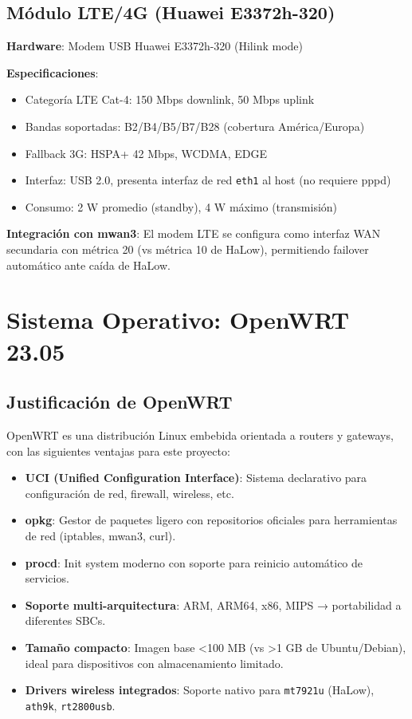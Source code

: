 \subsection{Módulo LTE/4G (Huawei E3372h-320)}

\textbf{Hardware}: Modem USB Huawei E3372h-320 (Hilink mode)

\textbf{Especificaciones}:
\begin{itemize}
    \item Categoría LTE Cat-4: 150 Mbps downlink, 50 Mbps uplink
    \item Bandas soportadas: B2/B4/B5/B7/B28 (cobertura América/Europa)
    \item Fallback 3G: HSPA+ 42 Mbps, WCDMA, EDGE
    \item Interfaz: USB 2.0, presenta interfaz de red \texttt{eth1} al host (no requiere pppd)
    \item Consumo: 2 W promedio (standby), 4 W máximo (transmisión)
\end{itemize}

\textbf{Integración con mwan3}: El modem LTE se configura como interfaz WAN secundaria con métrica 20 (vs métrica 10 de HaLow), permitiendo failover automático ante caída de HaLow.

\section{Sistema Operativo: OpenWRT 23.05}

\subsection{Justificación de OpenWRT}

OpenWRT es una distribución Linux embebida orientada a routers y gateways, con las siguientes ventajas para este proyecto:

\begin{itemize}
    \item \textbf{UCI (Unified Configuration Interface)}: Sistema declarativo para configuración de red, firewall, wireless, etc.
    \item \textbf{opkg}: Gestor de paquetes ligero con repositorios oficiales para herramientas de red (iptables, mwan3, curl).
    \item \textbf{procd}: Init system moderno con soporte para reinicio automático de servicios.
    \item \textbf{Soporte multi-arquitectura}: ARM, ARM64, x86, MIPS → portabilidad a diferentes SBCs.
    \item \textbf{Tamaño compacto}: Imagen base <100 MB (vs >1 GB de Ubuntu/Debian), ideal para dispositivos con almacenamiento limitado.
    \item \textbf{Drivers wireless integrados}: Soporte nativo para \texttt{mt7921u} (HaLow), \texttt{ath9k}, \texttt{rt2800usb}.
\end{itemize}

